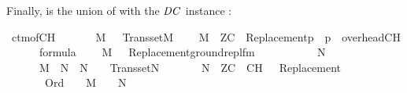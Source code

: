 Finally,  is the union
of  with the $\mathit{DC}$
instance :
\begin{isabelle}
\isamarkupfalse%
\ ctm{\isacharunderscore}{\kern0pt}of{\isacharunderscore}{\kern0pt}CH{\isacharcolon}{\kern0pt}\isanewline
\ \ \isanewline
\ \ \ \ {\isachardoublequoteopen}M\ {\isasymapprox}\ {\isasymomega}{\isachardoublequoteclose}\ {\isachardoublequoteopen}Transset{\isacharparenleft}{\kern0pt}M{\isacharparenright}{\kern0pt}{\isachardoublequoteclose}\isanewline
\ \ \ \ {\isachardoublequoteopen}M\ {\isasymTurnstile}\ ZC\ {\isasymunion}\ {\isacharbraceleft}{\kern0pt}{\isasymcdot}Replacement{\isacharparenleft}{\kern0pt}p{\isacharparenright}{\kern0pt}{\isasymcdot}\ {\isachardot}{\kern0pt}\ p\ {\isasymin}\ overhead{\isacharunderscore}{\kern0pt}CH{\isacharbraceright}{\kern0pt}{\isachardoublequoteclose}\isanewline
\ \ \ \ {\isachardoublequoteopen}{\isasymPhi}\ {\isasymsubseteq}\ formula{\isachardoublequoteclose}\isanewline
\ \ \ \ {\isachardoublequoteopen}M\ {\isasymTurnstile}\ {\isacharbraceleft}{\kern0pt}\ {\isasymcdot}Replacement{\isacharparenleft}{\kern0pt}ground{\isacharunderscore}{\kern0pt}repl{\isacharunderscore}{\kern0pt}fm{\isacharparenleft}{\kern0pt}{\isasymphi}{\isacharparenright}{\kern0pt}{\isacharparenright}{\kern0pt}{\isasymcdot}\ {\isachardot}{\kern0pt}\ {\isasymphi}\ {\isasymin}\ {\isasymPhi}{\isacharbraceright}{\kern0pt}{\isachardoublequoteclose}\isanewline
\ \ \isanewline
\ \ \ \ {\isachardoublequoteopen}{\isasymexists}N{\isachardot}{\kern0pt}\isanewline
\ \ \ \ \ \ M\ {\isasymsubseteq}\ N\ {\isasymand}\ N\ {\isasymapprox}\ {\isasymomega}\ {\isasymand}\ Transset{\isacharparenleft}{\kern0pt}N{\isacharparenright}{\kern0pt}\ {\isasymand}\isanewline
\ \ \ \ \ \ N\ {\isasymTurnstile}\ ZC\ {\isasymunion}\ {\isacharbraceleft}{\kern0pt}{\isasymcdot}CH{\isasymcdot}{\isacharbraceright}{\kern0pt}\ {\isasymunion}\ {\isacharbraceleft}{\kern0pt}\ {\isasymcdot}Replacement{\isacharparenleft}{\kern0pt}{\isasymphi}{\isacharparenright}{\kern0pt}{\isasymcdot}\ {\isachardot}{\kern0pt}\ {\isasymphi}\ {\isasymin}\ {\isasymPhi}{\isacharbraceright}{\kern0pt}\ {\isasymand}\isanewline
\ \ \ \ \ \ {\isacharparenleft}{\kern0pt}{\isasymforall}{\isasymalpha}{\isachardot}{\kern0pt}\ Ord{\isacharparenleft}{\kern0pt}{\isasymalpha}{\isacharparenright}{\kern0pt}\ {\isasymlongrightarrow}\ {\isacharparenleft}{\kern0pt}{\isasymalpha}\ {\isasymin}\ M\ {\isasymlongleftrightarrow}\ {\isasymalpha}\ {\isasymin}\ N{\isacharparenright}{\kern0pt}{\isacharparenright}{\kern0pt}{\isachardoublequoteclose}
\end{isabelle}

